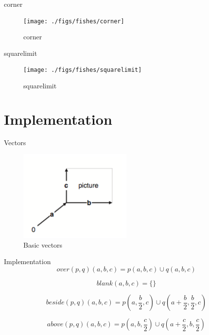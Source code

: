 \documentclass{beamer}
\begin{document}
    \begin{frame}{corner}

        \begin{figure}
            \centering
            \texttt{[image: ./figs/fishes/corner]}
            \caption{corner}
            \label{fig:corner}
        \end{figure}

    \end{frame}

    \begin{frame}{squarelimit}

        \begin{figure}
            \centering
            \texttt{[image: ./figs/fishes/squarelimit]}
            \caption{squarelimit}
            \label{fig:squarelimit}
        \end{figure}

    \end{frame}

    \section{Implementation}

    \begin{frame}{Vectors}
        \begin{figure}
            \centering
            \includegraphics[width=0.5\textwidth]{./figs/vectors}
            \caption{Basic vectors}
            \label{fig:vectors}
        \end{figure}
    \end{frame}

    \begin{frame}{Implementation}
        \begin{equation*}
        over(p, q)(a, b, c) = p(a, b, c) \cup q(a, b, c)
        \end{equation*}

        \begin{equation*}
        blank(a, b, c) = \text{\{\}}
        \end{equation*}

        \begin{equation*}
        beside(p, q)(a, b, c) = p(a, \frac{b}{2}, c) \cup q(a + \frac{b}{2}, \frac{b}{2}, c)
        \end{equation*}

        \begin{equation*}
        above(p, q)(a, b, c) = p(a, b, \frac{c}{2}) \cup q (a + \frac{c}{2}, b, \frac{c}{2})
        \end{equation*}
    \end{frame}
\end{document}

